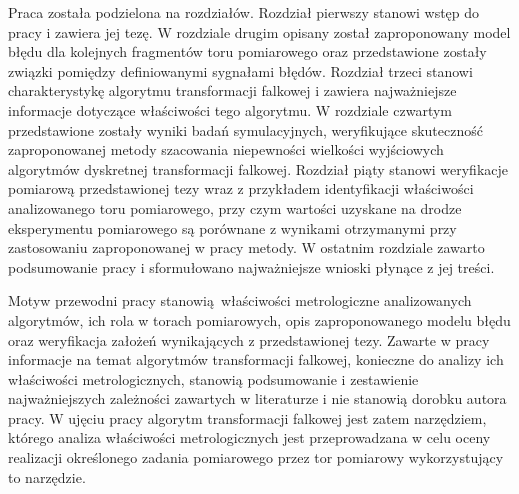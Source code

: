 Praca została podzielona na  rozdziałów. Rozdział pierwszy stanowi wstęp do pracy i zawiera jej tezę. W rozdziale drugim opisany został zaproponowany model błędu dla kolejnych fragmentów toru pomiarowego oraz przedstawione zostały związki pomiędzy definiowanymi sygnałami błędów. Rozdział trzeci stanowi charakterystykę algorytmu transformacji falkowej i zawiera najważniejsze informacje dotyczące właściwości tego algorytmu. W rozdziale czwartym przedstawione zostały wyniki badań symulacyjnych, weryfikujące skuteczność zaproponowanej metody szacowania niepewności wielkości wyjściowych algorytmów dyskretnej transformacji falkowej. Rozdział piąty stanowi weryfikacje pomiarową przedstawionej tezy wraz z przykładem identyfikacji właściwości analizowanego toru pomiarowego, przy czym wartości uzyskane na drodze eksperymentu pomiarowego są porównane z wynikami otrzymanymi przy zastosowaniu zaproponowanej w pracy metody. W ostatnim rozdziale zawarto podsumowanie pracy i sformułowano najważniejsze wnioski płynące z jej treści.

Motyw przewodni pracy stanowią właściwości metrologiczne analizowanych algorytmów, ich rola w torach pomiarowych, opis zaproponowanego modelu błędu oraz weryfikacja założeń wynikających z przedstawionej tezy. Zawarte w pracy informacje na temat algorytmów transformacji falkowej, konieczne do analizy ich właściwości metrologicznych, stanowią podsumowanie i zestawienie najważniejszych zależności zawartych w literaturze i nie stanowią dorobku autora pracy. W ujęciu pracy algorytm transformacji falkowej jest zatem narzędziem, którego analiza właściwości metrologicznych jest przeprowadzana w celu oceny realizacji określonego zadania pomiarowego przez tor pomiarowy wykorzystujący to narzędzie.
